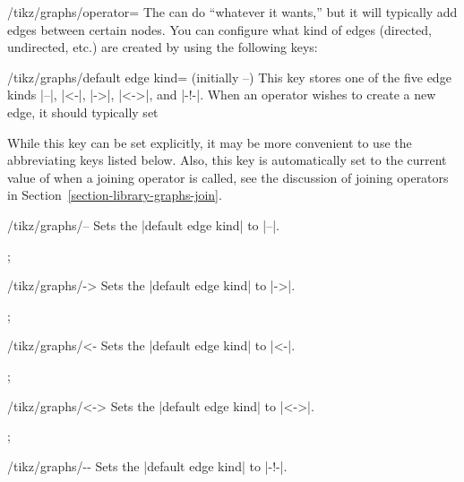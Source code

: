 \begin{key}{/tikz/graphs/operator=}
  The  can do ``whatever it wants,'' but it will typically
  add edges between certain nodes. You can configure what kind of
  edges (directed, undirected, etc.) are created by using the
  following keys:
  \begin{key}{/tikz/graphs/default edge kind= (initially --)}
    This key stores one of the five edge kinds |--|, |<-|, |->|,
    |<->|, and |-!-|. When an operator wishes to create a new edge, it
    should typically set
\begin{codeexample}
\end{codeexample}
    While this key can be set explicitly, it may be more convenient to
    use the abbreviating keys listed below. Also, this key is
    automatically set to the current value of  when a joining operator is called, see the
    discussion of joining operators in
    Section~\ref{section-library-graphs-join}.
  \end{key}
  \begin{key}{/tikz/graphs/--}
    Sets the |default edge kind| to |--|.
\begin{codeexample}[]
\tikz {};      
\end{codeexample}
  \end{key}
  \begin{key}{/tikz/graphs/->}
    Sets the |default edge kind| to |->|.
\begin{codeexample}[]
\tikz {};      
\end{codeexample}
  \end{key}
  \begin{key}{/tikz/graphs/<-}
    Sets the |default edge kind| to |<-|.
\begin{codeexample}[]
\tikz {};      
\end{codeexample}
  \end{key}
  \begin{key}{/tikz/graphs/<->}
    Sets the |default edge kind| to |<->|.
\begin{codeexample}[]
\tikz {};      
\end{codeexample}
  \end{key}
  \begin{key}{/tikz/graphs/-\protect\exclamationmarktext-}
    Sets the |default edge kind| to |-!-|.
  \end{key}
  

\end{key}
